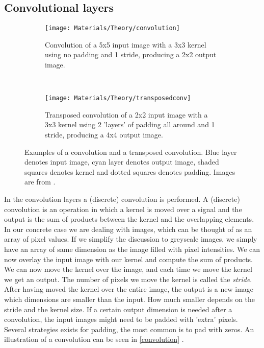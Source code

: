 \newpage
\subsection{Convolutional layers}
\begin{wrapfigure}{r}{0.3\linewidth}
	\vspace{-1.2cm}
	\centering
	\begin{subfigure}[b]{\linewidth}
		\centering
		\texttt{[image: Materials/Theory/convolution]}
		\caption{Convolution of a 5x5 input image with a 3x3 kernel using no padding and 1 stride, producing a 2x2 output image.}
		\label{convolution}
	\end{subfigure}
	\\
	\begin{subfigure}[b]{\linewidth}
		\centering
		\texttt{[image: Materials/Theory/transposedconv]}
		\caption{Transposed convolution of a 2x2 input image with a 3x3 kernel using 2 'layers' of padding all around and 1 stride, producing a 4x4 output image.}
		\label{transposedconv}
	\end{subfigure}
	\caption{Examples of a convolution and a transposed convolution. Blue layer denotes input image, cyan layer denotes output image, shaded squares denotes kernel and dotted squares denotes padding. Images are from \cite{convolutionarticle}.}
\end{wrapfigure}
In the convolution layers a (discrete) convolution is performed. A (discrete) convolution is an operation in which a kernel is moved over a signal and the output is the sum of products between the kernel and the overlapping elements. In our concrete case we are dealing with images, which can be thought of as an array of pixel values. If we simplify the discussion to greyscale images, we simply have an array of same dimension as the image filled with pixel intensities. We can now overlay the input image with our kernel and compute the sum of products. We can now move the kernel over the image, and each time we move the kernel we get an output. The number of pixels we move the kernel is called the \textit{stride}. After having moved the kernel over the entire image, the output is a new image which dimensions are smaller than the input. How much smaller depends on the stride and the kernel size. If a certain output dimension is needed after a convolution, the input images might need to be padded with 'extra' pixels. Several strategies exists for padding, the most common is to pad with zeros. An illustration of a convolution can be seen in \autoref{convolution} \cite{convolutionarticle}.

